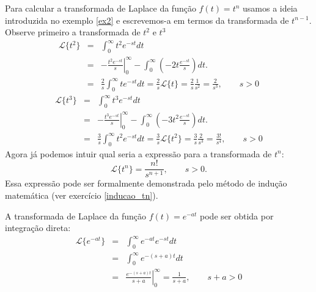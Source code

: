 \begin{ex} Para calcular a transformada de Laplace da função $f(t)=t^n$ usamos a ideia introduzida no exemplo \ref{ex2} e escrevemos-a em termos da transformada de $t^{n-1}$. Observe primeiro a transformada de $t^2$ e $t^3$
\begin{eqnarray*}
\mathcal{L}\{t^2\}&=&\int_0^\infty t^2e^{-st}dt\\
&=&\left.-\frac{t^2 e^{-st}}{s}\right|_0^\infty-\int_0^\infty \left(-2t\frac{e^{-st}}{s}\right)dt .\\
&=&\frac{2}{s}\int_0^\infty te^{-st}dt=\frac{2}{s}\mathcal{L}\{t\}=\frac{2}{s}\frac{1}{s^2}=\frac{2}{s^3},\qquad s>0
\end{eqnarray*}
\begin{eqnarray*}
\mathcal{L}\{t^3\}&=&\int_0^\infty t^3e^{-st}dt\\
&=&\left.-\frac{t^3 e^{-st}}{s}\right|_0^\infty-\int_0^\infty \left(-3t^2\frac{e^{-st}}{s}\right)dt .\\
&=&\frac{3}{s}\int_0^\infty t^2e^{-st}dt=\frac{3}{s}\mathcal{L}\{t^2\}=\frac{3}{s}\frac{2}{s^3}=\frac{3!}{s^4},\qquad s>0
\end{eqnarray*}
Agora já podemos intuir qual seria a expressão para a transformada de $t^n$:
\begin{equation}
\mathcal{L}\{t^n\}=\frac{n!}{s^{n+1}},\qquad s>0.
\end{equation}
Essa expressão pode ser formalmente demonstrada pelo método de indução matemática (ver exercício \ref{inducao_tn}).
\end{ex}
\begin{ex}{\label{ex_trans_exp}}A transformada de Laplace da função $f(t)=e^{-at}$ pode ser obtida por integração direta:
\begin{eqnarray*}
\mathcal{L}\{e^{-at}\}&=&\int_0^\infty e^{-at}e^{-st}dt\\
&=&\int_0^\infty e^{-(s+a)t}dt\\
&=&\left.\frac{e^{-(s+a)t}}{s+a}\right|_0^\infty=\frac{1}{s+a},\qquad s+a>0
\end{eqnarray*}
\end{ex}
